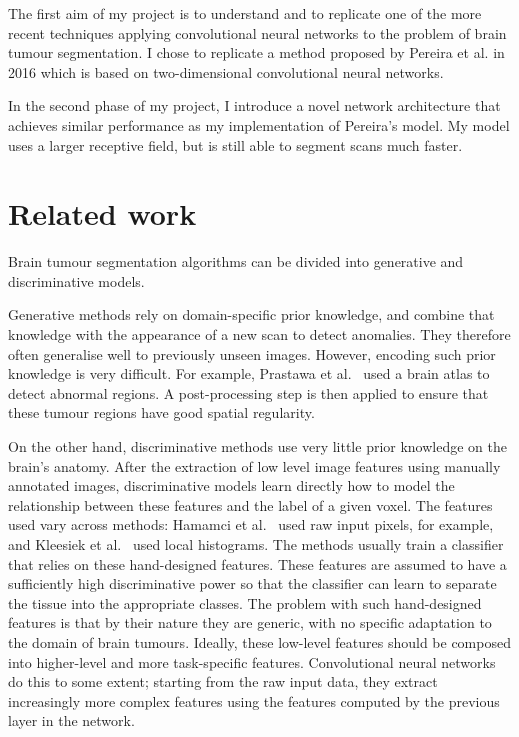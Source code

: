 \documentclass[12pt,a4paper,twoside,openright]{report}
\begin{document}
The first aim of my project is to understand and to replicate one of the more recent techniques applying convolutional neural networks to the problem of brain tumour segmentation. I chose to replicate a method proposed by Pereira et al.\cite{pereira} in 2016 which is based on two-dimensional convolutional neural networks. 

In the second phase of my project, I introduce a novel network architecture that achieves similar performance as my implementation of Pereira's model. My model uses a larger receptive field, but is still able to segment scans much faster.

\section{Related work}
Brain tumour segmentation algorithms can be divided into generative and discriminative models.

Generative methods rely on domain-specific prior knowledge, and combine that knowledge with the appearance of a new scan to detect anomalies. They therefore often generalise well to previously unseen images. However, encoding such prior knowledge is very difficult. For example, Prastawa et al.\ \cite{prastawa} used a brain atlas to detect abnormal regions. A post-processing step is then applied to ensure that these tumour regions have good spatial regularity.

On the other hand, discriminative methods use very little prior knowledge on the brain's anatomy. After the extraction of low level image features using manually annotated images, discriminative models learn directly how to model the relationship between these features and the label of a given voxel. The features used vary across methods: Hamamci et al.\ \cite{hamamci} used raw input pixels, for example, and Kleesiek et al.\ \cite{kleesiek} used local histograms. The methods usually train a classifier that relies on these hand-designed features. These features are assumed to have a sufficiently high discriminative power so that the classifier can learn to separate the tissue into the appropriate classes. The problem with such \mbox{hand-designed} features is that by their nature they are generic, with no specific adaptation to the domain of brain tumours. Ideally, these low-level features should be composed into higher-level and more task-specific features. Convolutional neural networks do this to some extent; starting from the raw input data, they extract increasingly more complex features using the features computed by the previous layer in the network.
\end{document}
